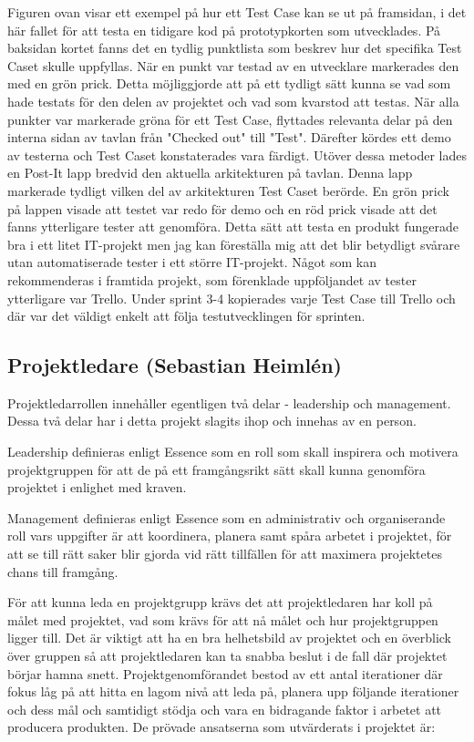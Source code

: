 \documentclass[conference,a4paper]{IEEEtran}
\begin{document}
Figuren ovan visar ett exempel på hur ett Test Case kan se ut på framsidan, i det här fallet för att testa en tidigare kod på prototypkorten som utvecklades. På baksidan kortet fanns det en tydlig punktlista som beskrev hur det specifika Test Caset skulle uppfyllas. När en punkt var testad av en utvecklare markerades den med en grön prick. Detta möjliggjorde att på ett tydligt sätt kunna se vad som hade testats för den delen av projektet och vad som kvarstod att testas. När alla punkter var markerade gröna för ett Test Case, flyttades relevanta delar på den interna sidan av tavlan från "Checked out" till "Test". Därefter kördes ett demo av testerna och Test Caset konstaterades vara färdigt. 
Utöver dessa metoder lades en Post-It lapp bredvid den aktuella arkitekturen på tavlan. Denna lapp markerade tydligt vilken del av arkitekturen Test Caset berörde. En grön prick på lappen visade att testet var redo för demo och en röd prick visade att det fanns ytterligare tester att genomföra. 
Detta sätt att testa en produkt fungerade bra i ett litet IT-projekt men jag kan föreställa mig att det blir betydligt svårare utan automatiserade tester i ett större IT-projekt. 
Något som kan rekommenderas i framtida projekt, som förenklade uppföljandet av tester ytterligare var Trello. Under sprint 3-4 kopierades varje Test Case till Trello och där var det väldigt enkelt att följa testutvecklingen för sprinten. 


\subsection{Projektledare (Sebastian Heimlén)}
Projektledarrollen innehåller egentligen två delar - leadership och management. Dessa två delar har i detta projekt slagits ihop och innehas av en person.

Leadership definieras enligt Essence \cite{ivarjacobson2017} som en roll som skall inspirera och motivera projektgruppen för att de på ett framgångsrikt sätt skall kunna genomföra projektet i enlighet med kraven.

Management definieras enligt Essence \cite{ivarjacobson2017} som en administrativ och organiserande roll vars uppgifter är att koordinera, planera samt spåra arbetet i projektet, för att se till rätt saker blir gjorda vid rätt tillfällen för att maximera projektetes chans till framgång.

För att kunna leda en projektgrupp krävs det att projektledaren har koll på målet med projektet, vad som krävs för att nå målet och hur projektgruppen ligger till. Det är viktigt att ha en bra helhetsbild av projektet och en överblick över gruppen så att projektledaren kan ta snabba beslut i de fall där projektet börjar hamna snett. Projektgenomförandet bestod av ett antal iterationer där fokus låg på att hitta en lagom nivå att leda på, planera upp följande iterationer och dess mål och samtidigt stödja och vara en bidragande faktor i arbetet att producera produkten. De prövade ansatserna som utvärderats i projektet är:
\end{document}
